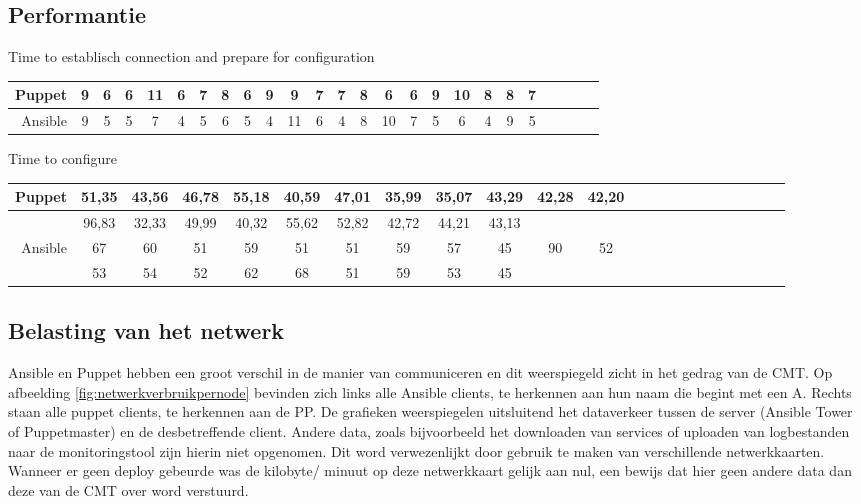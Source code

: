 \subsection{Performantie}
  Time to establisch connection and prepare for configuration \newline
\begin{tabular}{| r |c |c |c |c |c |c |c |c |c |c |c |c |c |c |c |c |c |c |c |c |c |c |c |c |}
  \hline	  		
Puppet & 9 & 6 & 6 & 	11 & 	6 & 7 & 8 & 6 & 9 & 9 & 7 & 7 &	 8 & 6 & 6 & 9 & 10 & 8 & 8 & 7\\
   \hline
  Ansible & 9 & 5 & 5 & 7 & 4 & 5 & 6 & 5 & 4 & 11 & 6 & 4 & 8 & 10 & 7 & 5 & 6 & 4 & 9 & 5 \\
  \hline  
\end{tabular}


Time to configure

\begin{tabular}{| r |c |c |c |c |c |c |c |c |c |c |c |c |c |c |c |c |c |c |c |c | c c |}
  \hline			
  
Puppet & 51,35 & 43,56 & 46,78 & 55,18 & 40,59 & 47,01 & 35,99 & 35,07 & 43,29 & 42,28 & 42,20 \\ \hline
            & 96,83 & 32,33 & 49,99 & 40,32 & 55,62 & 52,82 & 42,72 & 44,21 & 43,13 & &  \\ \hline
            
   
  Ansible & 67 & 60 & 51 & 59 & 51 & 51 & 59 & 57 & 45 & 90 & 52  \\ \hline
                & 53 & 54 & 52 & 62 & 68 & 51 & 59 & 53 & 45 & & \\
  \hline  
\end{tabular}

\subsection{Belasting van het netwerk}

Ansible en Puppet hebben een groot verschil in de manier van communiceren en dit weerspiegeld zicht in het gedrag van de CMT. Op afbeelding \ref{fig:netwerkverbruikpernode} bevinden zich links alle Ansible clients, te herkennen aan hun naam die begint met een A. Rechts staan alle puppet clients, te herkennen aan de PP. De grafieken weerspiegelen uitsluitend het dataverkeer tussen de server (Ansible Tower of Puppetmaster) en de desbetreffende client. Andere data, zoals bijvoorbeeld het downloaden van services of uploaden van logbestanden naar de monitoringstool zijn hierin niet opgenomen. Dit word verwezenlijkt door gebruik te maken van verschillende netwerkkaarten. Wanneer er geen deploy gebeurde was de kilobyte/ minuut op deze netwerkkaart gelijk aan nul, een bewijs dat hier geen andere data dan deze van de CMT over word verstuurd.  \newline

